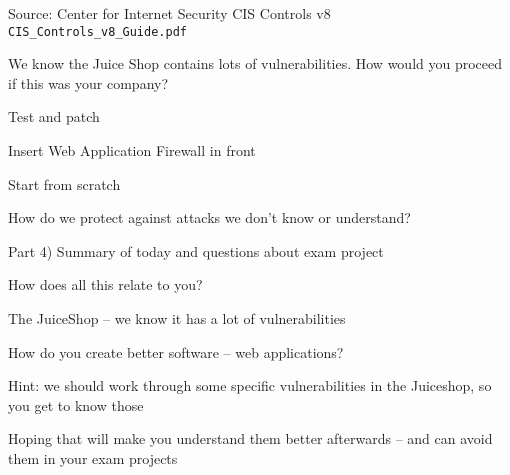 \documentclass[Screen16to9,17pt]{foils}
\begin{document}
Source: Center for Internet Security CIS Controls v8 \verb+CIS_Controls_v8_Guide.pdf+






We know the Juice Shop contains lots of vulnerabilities. How would you proceed if this was your company?


\begin{list2}
\item Test and patch
\item Insert Web Application Firewall in front
\item Start from scratch
\end{list2}

How do we protect against attacks we don't know or understand?


Part 4) Summary of today and questions about exam project

How does all this relate to you?

\begin{list2}
\item The JuiceShop -- we know it has a lot of vulnerabilities
\item How do you create better software -- web applications?
\end{list2}


Hint: we should work through some specific vulnerabilities in the Juiceshop, so you get to know those

Hoping that will make you understand them better afterwards -- and can avoid them in your exam projects


\slidenext{}
\end{document}
